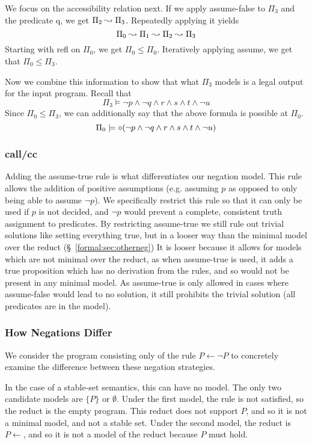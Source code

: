 We focus on the accessibility relation next.
If we apply assume-false to $\Pi_3$ and the predicate q, we get $\Pi_2 \leadsto \Pi_3$.
Repeatedly applying it yields
\[
	\Pi_0 \leadsto \Pi_1 \leadsto \Pi_2 \leadsto \Pi_3
\]
Starting with refl on $\Pi_0$, we get $\Pi_0 \leq \Pi_0$.
Iteratively applying assume, we get that $\Pi_0 \leq \Pi_3$.

Now we combine this information to show that what $\Pi_3$ models is a legal output for the input program.
Recall that
\[
	\Pi_3 \models \neg p \wedge \neg q \wedge r \wedge s \wedge t \wedge \neg u
\]
Since $\Pi_0 \leq \Pi_3$, we can additionally say that the above formula is possible at $\Pi_0$.
\[
	\Pi_0 \models \diamond (\neg p \wedge \neg q \wedge r \wedge s \wedge t \wedge \neg u)
\]

\subsubsection{call/cc}
Adding the assume-true rule is what differentiates our negation model.
This rule allows the addition of positive assumptions (e.g. assuming $p$ as opposed to only being able to assume $\neg p$).
We specifically restrict this rule so that it can only be used if $p$ is not decided, and $\neg p$ would prevent a complete, consistent truth assignment to predicates.
By restricting assume-true we still rule out trivial solutions like setting everything true, but in a looser way than the minimal model over the reduct (\S~\ref{formal:sec:otherneg})
It is looser because it allows for models which are not minimal over the reduct, as when assume-true is used, it adds a true proposition which has no derivation from the rules, and so would not be present in any minimal model.
As assume-true is only allowed in cases where assume-false would lead to no solution, it still prohibits the trivial solution (all predicates are in the model).

\subsubsection{How Negations Differ}
We consider the program consisting only of the rule $P \leftarrow \neg P$ to concretely examine the difference between these negation strategies.

In the case of a stable-set semantics, this can have no model.
The only two candidate models are $\{P\}$ or $\emptyset$.
Under the first model, the rule is not satisfied, so the reduct is the empty program.
This reduct does not support $P$, and so it is not a minimal model, and not a stable set.
Under the second model, the reduct is $P \leftarrow$, and so it is not a model of the reduct because $P$ must hold.

